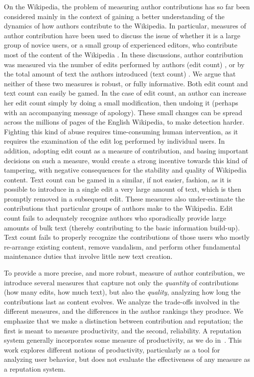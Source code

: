 On the Wikipedia, the problem of measuring author contributions has
so far been considered mainly in the context of gaining a better
understanding of the dynamics of how authors contribute to the
Wikipedia. 
In particular, measures of author contribution have been used to
discuss the issue of whether it is a large group of novice users, or a
small group of experienced editors, who contribute most of the
content of the Wikipedia \cite{Wales2005,Swartz2006,Bourgeoisie2007}. 
In these discussions, author contribution was measured via the number
of edits performed by authors (edit count) \cite{Wales2005,EditsEqQuality2007,
Bourgeoisie2007,WikiDashboard2008,OrtegaBarahona2007,SteinHess2007},
or by the total amount of text the authors introduced (text count)
\cite{Swartz2006}. 
We argue that neither of these two measures is robust, or fully
informative. 
Both edit count and text count can easily be gamed. 
In the case of edit count, an author can increase her edit count
simply by doing a small modification, then undoing it (perhaps with an
accompanying message of apology).  
These small changes can be spread across the millions of pages of the
English Wikipedia, to make detection harder. 
Fighting this kind of abuse requires time-consuming human
intervention, as it requires the examination of the edit log performed
by individual users. 
In addition, adopting edit count as a measure of contribution,
and basing important decisions on such a measure, would create a strong
incentive towards this kind of tampering, with negative consequences
for the stability and quality of Wikipedia content. 
Text count can be gamed in a similar, if not easier, fashion, as it is
possible to introduce in a single edit a very large amount of text,
which is then promptly removed in a subsequent edit. 
These measures also under-estimate the contributions that particular
groups of authors make to the Wikipedia. 
Edit count fails to adequately recognize authors who sporadically provide
large amounts of bulk text (thereby contributing to the basic information
build-up).
Text count fails to properly recognize the contributions of those
users who mostly re-arrange existing content, remove vandalism, and
perform other fundamental maintenance duties that involve little new
text creation. 

To provide a more precise, and more robust, measure of author
contribution, we introduce several measures that capture not only the 
{\em quantity\/} of contributions (how many edits, how much text),
but also the {\em quality\/}, analyzing how long the contributions last
as content evolves. 
We analyze the trade-offs involved in the different measures, and the
differences in the author rankings they produce. 
We emphasize that we make a distinction between
contribution and reputation; the first is meant to measure productivity,
and the second, reliability.
A reputation system generally incorporates some measure of productivity,
as we do in~\cite{Adler2007}.
This work explores different notions of productivity,
particularly as a tool for analyzing user behavior,
but does not evaluate the effectiveness of any measure
as a reputation system.

